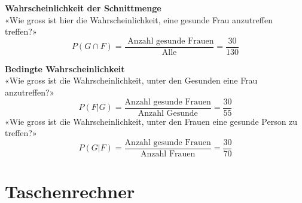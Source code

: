 \begin{multicols}{2}
\textbf{Wahrscheinlichkeit der Schnittmenge}\\
«Wie gross ist hier die Wahrscheinlichkeit, eine gesunde Frau anzutreffen treffen?»
$$P(G\cap F) = \frac{\textrm{\ Anzahl gesunde Frauen}}{\textrm{Alle}}= \frac{30}{130}$$

\textbf{Bedingte Wahrscheinlichkeit}\\
«Wie gross ist die Wahrscheinlichkeit, unter den Gesunden eine Frau anzutreffen?»
$$P(F | G) = \frac{\textrm{Anzahl gesunde Frauen}}{\textrm{Anzahl Gesunde}} =  \frac{30}{55}$$
«Wie gross ist die Wahrscheinlichkeit, unter den Frauen eine gesunde Person zu treffen?»
$$P(G | F) = \frac{\textrm{Anzahl gesunde Frauen}}{\textrm{Anzahl Frauen}}=  \frac{30}{70}$$

\end{multicols}


\newpage
\headerUndFooterDieseSeite{}

\section*{Taschenrechner}

